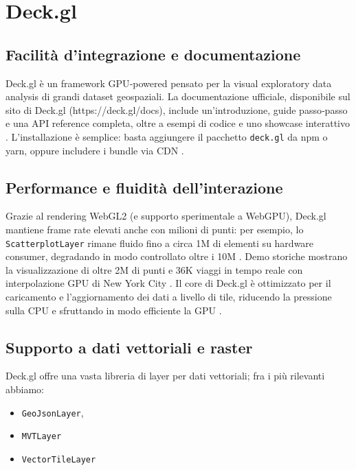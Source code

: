 \section{Deck.gl}
\label{ch:deckgl}

\subsection{Facilità d'integrazione e documentazione}  
Deck.gl è un framework GPU‑powered pensato per la visual exploratory data analysis di grandi dataset geospaziali.  
La documentazione ufficiale, disponibile sul sito di Deck.gl (https://deck.gl/docs), include un'introduzione, guide passo‑passo e una API reference completa, oltre a esempi di codice e uno showcase interattivo \cite{deckgl-docs}.  
L'installazione è semplice: basta aggiungere il pacchetto \texttt{deck.gl} da npm o yarn, oppure includere i bundle via CDN \cite{deckgl-npm,deckgl-github}.  

\subsection{Performance e fluidità dell'interazione}  
Grazie al rendering WebGL2 (e supporto sperimentale a WebGPU), Deck.gl mantiene frame rate elevati anche con milioni di punti: per esempio, lo \texttt{ScatterplotLayer} rimane fluido fino a circa 1M di elementi su hardware consumer, degradando in modo controllato oltre i 10M \cite{deckgl-performance}.  
Demo storiche mostrano la visualizzazione di oltre 2M di punti e 36K viaggi in tempo reale con interpolazione GPU di New York City \cite{deckgl-uber-blog}.  
Il core di Deck.gl è ottimizzato per il caricamento e l'aggiornamento dei dati a livello di tile, riducendo la pressione sulla CPU e sfruttando in modo efficiente la GPU \cite{deckgl-github}.  

\subsection{Supporto a dati vettoriali e raster}  
Deck.gl offre una vasta libreria di layer per dati vettoriali; fra i più rilevanti abbiamo: 

\begin{itemize}
    \item \texttt{GeoJsonLayer},
    \item \texttt{MVTLayer}
    \item \texttt{VectorTileLayer}
\end{itemize}

